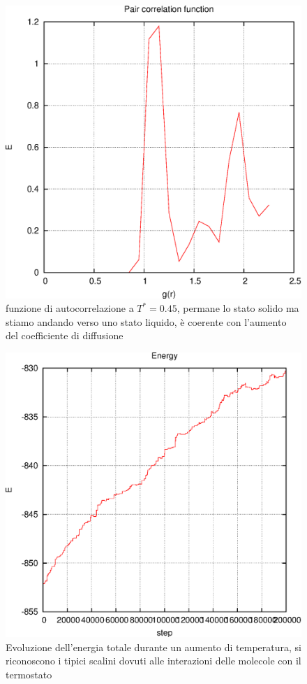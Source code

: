 \documentclass[a4paper,11pt]{article}
\begin{document}
			\begin{figure}[H]
				\centering
				\includegraphics[scale=0.7]{gr_0_45.eps}
				\caption{funzione di autocorrelazione a $T^*=0.45$, permane lo stato solido ma stiamo andando verso uno stato liquido, è coerente con l'aumento del coefficiente di diffusione}
				\label{fig:gr045}
			\end{figure}

			\begin{figure}[H]
				\centering
				\includegraphics[scale=0.7]{Energy_evolution.eps}
				\caption{Evoluzione dell'energia totale durante un aumento di temperatura, si riconoscono i tipici scalini dovuti alle interazioni delle molecole con il termostato}
			\end{figure}
\end{document}
